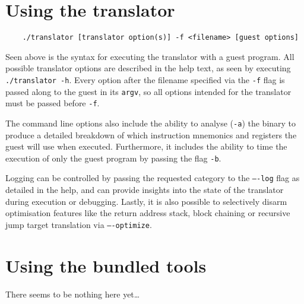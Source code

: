 \section{Using the translator}
\label{sec:translator-usage}
\begin{lstlisting}
	./translator [translator option(s)] -f <filename> [guest options]
\end{lstlisting}

Seen above is the syntax for executing the translator with a guest program.
All possible translator options are described in the help text, as seen by executing \texttt{./translator -h}.
Every option after the filename specified via the \texttt{-f} flag is passed along to the guest in its \texttt{argv}, so all options intended for the translator must be passed before \texttt{-f}.

The command line options also include the ability to analyse (\texttt{-a}) the binary to produce a detailed breakdown of which instruction mnemonics and registers the guest will use when executed.
Furthermore, it includes the ability to time the execution of only the guest program by passing the flag \texttt{-b}.

Logging can be controlled by passing the requested category to the \texttt{----log} flag as detailed in the help, and can provide insights into the state of the translator during execution or debugging.
Lastly, it is also possible to selectively disarm optimisation features like the return address stack, block chaining or recursive jump target translation via \texttt{----optimize}.


\section{Using the bundled tools}
There seems to be nothing here yet\ldots









